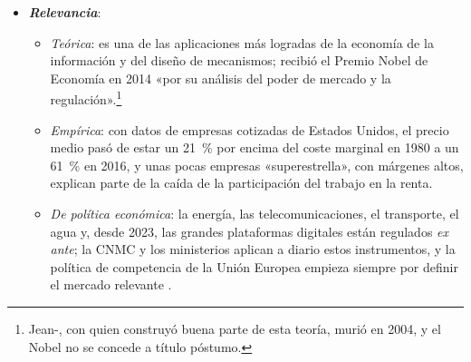 \documentclass[11pt]{article}
\begin{document}
\begin{itemize}
\item \textbf{\emph{Relevancia}}:
  \begin{itemize}
  \item \emph{Teórica}: es una de las aplicaciones más logradas de la economía de la información y del diseño de mecanismos;  recibió el Premio Nobel de Economía en 2014 «por su análisis del poder de mercado y la regulación»\nocite{Nobel2014Tirole}.\footnote{Jean-, con quien  construyó buena parte de esta teoría, murió en 2004\nocite{TSE2024Laffont}, y el Nobel no se concede a título póstumo.}
  \item \emph{Empírica}: con datos de empresas cotizadas de Estados Unidos, el precio medio pasó de estar un 21~\% por encima del coste marginal en 1980 a un 61~\% en 2016\nocite{DeLoeckerEeckhoutUnger2020Rise}, y unas pocas empresas «superestrella», con márgenes altos, explican parte de la caída de la participación del trabajo en la renta\nocite{AutorEtAl2020Fall}.
  \item \emph{De política económica}: la energía, las telecomunicaciones, el transporte, el agua y, desde 2023, las grandes plataformas digitales están regulados \emph{ex ante}\nocite{UE2022DMA}; la CNMC y los ministerios aplican a diario estos instrumentos, y la política de competencia de la Unión Europea empieza siempre por definir el mercado relevante  .
  \end{itemize}


\end{itemize}
\end{document}
